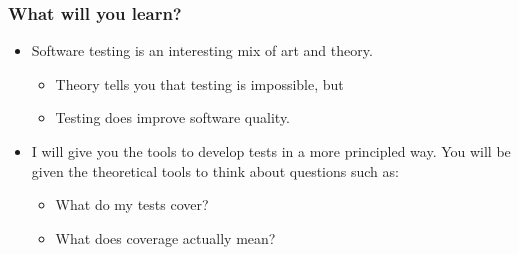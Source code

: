 \documentclass{beamer}
\begin{document}
%
\begin{frame}
  \frametitle{What will you learn?}
  \begin{itemize}
  \item Software testing is an interesting mix of art and theory.
    \begin{itemize}
    \item Theory tells you that testing is impossible, but
    \item Testing does improve software quality.
    \end{itemize}
  \item I will give you the tools to develop tests in a more
    principled way. You will be given the theoretical tools to think
    about questions such as:
    \begin{itemize}
    \item What do my tests cover?
    \item What does coverage actually mean? 
    \end{itemize}
  \end{itemize}
\end{frame}
\end{document}
